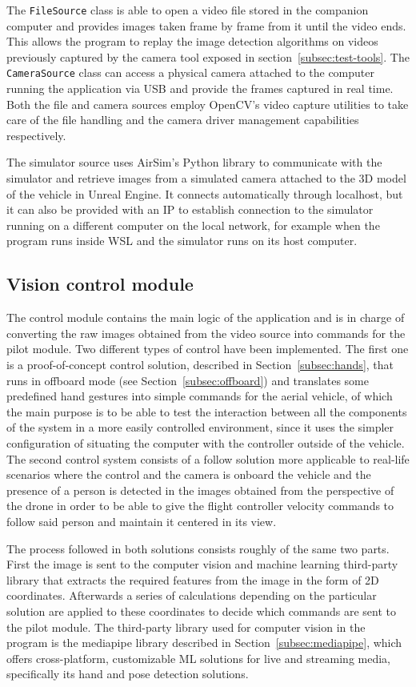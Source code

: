 The \texttt{FileSource} class is able to open a video file stored in the companion computer and provides images taken frame by frame from it until the video ends.
This allows the program to replay the image detection algorithms on videos previously captured by the camera tool exposed in section~\ref{subsec:test-tools}.
The \texttt{CameraSource} class can access a physical camera attached to the computer running the application via USB and provide the frames captured in real time.
Both the file and camera sources employ OpenCV's video capture utilities to take care of the file handling and the camera driver management capabilities respectively.

The simulator source uses AirSim's Python library to communicate with the simulator and retrieve images from a simulated camera attached to the 3D model of the vehicle in Unreal Engine.
It connects automatically through localhost, but it can also be provided with an IP to establish connection to the simulator running on a different computer on the local network, for example when the program runs inside WSL and the simulator runs on its host computer.

\subsection{Vision control module}
The control module contains the main logic of the application and is in charge of converting the raw images obtained from the video source into commands for the pilot module.
Two different types of control have been implemented.
The first one is a proof-of-concept control solution, described in Section~\ref{subsec:hands}, that runs in offboard mode (see Section~\ref{subsec:offboard}) and translates some predefined hand gestures into simple commands for the aerial vehicle, of which the main purpose is to be able to test the interaction between all the components of the system in a more easily controlled environment, since it uses the simpler configuration of situating the computer with the controller outside of the vehicle.
The second control system consists of a follow solution more applicable to real-life scenarios where the control and the camera is onboard the vehicle and the presence of a person is detected in the images obtained from the perspective of the drone in order to be able to give the flight controller velocity commands to follow said person and maintain it centered in its view.

The process followed in both solutions consists roughly of the same two parts.
First the image is sent to the computer vision and machine learning third-party library that extracts the required features from the image in the form of 2D coordinates.
Afterwards a series of calculations depending on the particular solution are applied to these coordinates to decide which commands are sent to the pilot module.
The third-party library used for computer vision in the program is the mediapipe library described in Section~\ref{subsec:mediapipe}, which offers cross-platform, customizable ML solutions for live and streaming media, specifically its hand and pose detection solutions.

